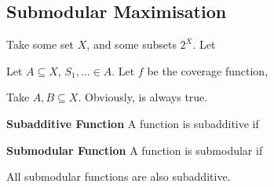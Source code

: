 \subsection{Submodular Maximisation}

Take some set $X$, and some subsets $2^X$. Let

\begin{example}
    Let $A \subseteq X$, $S_1, \ldots \in A$.
    Let $f$ be the coverage function,
\end{example}

Take $A, B \subseteq X$. Obviously,
is always true.

\begin{definition}
    \textbf{Subadditive Function}
    A function
    is subadditive if
\end{definition}

\begin{definition}
    \textbf{Submodular Function}
    A function
    is submodular if
\end{definition}

All submodular functions are also subadditive.

